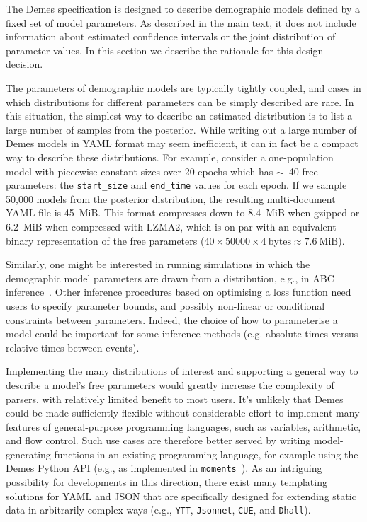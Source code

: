 \documentclass[11pt]{article}
\newcommand{\moments}[0]{\texttt{moments}}
\newcommand{\ggcomment}[1]{{\textcolor{yellow!60!red}{GG: #1}}}
\begin{document}
The Demes specification is designed to describe demographic
models defined by a fixed set of model parameters.
As described in the main text, it does not include
information about estimated confidence intervals or the joint distribution
of parameter values. In this section we describe the rationale
for this design decision.

The parameters of
demographic models are typically tightly coupled, and cases in which
distributions for different parameters can be simply described are rare.
In this situation, the simplest way to describe an estimated
distribution is to list a large number of samples from
the posterior. While writing out a large number of Demes models in
YAML format may seem inefficient, it can in fact be a compact
way to describe these distributions.
For example, consider a one-population model with piecewise-constant sizes over
20 epochs which has $\sim$~40 free parameters: the \texttt{start\_size} and
\texttt{end\_time} values for each epoch. If we sample 50,000 models
from the posterior distribution, the resulting multi-document YAML file is
45~MiB.
This format compresses down to 8.4~MiB when gzipped or 6.2~MiB
when compressed with LZMA2, which is on par with an equivalent binary
representation of the free parameters
($40\times50000\times4~\text{bytes} \approx 7.6~\text{MiB}$).

Similarly, one might be interested in running simulations in which
the demographic model parameters are drawn from a distribution, e.g.,
in ABC inference~\citep{beaumont2002approximate}.
Other inference procedures based on optimising a loss function
\citep{gutenkunst2009inferring,kamm2017efficient,jouganous2017inferring,ragsdale2019models,excoffier2021fastsimcoal2}
need users to specify parameter bounds,
and possibly non-linear or conditional constraints between parameters.
Indeed, the choice of how to parameterise a model could be important for
some inference methods (e.g. absolute times versus relative times between events).

Implementing the many distributions of interest and supporting a general
way to describe a model's free parameters would greatly increase the
complexity of parsers, with relatively limited benefit to most users.
It's unlikely that Demes could be made sufficiently
flexible without considerable effort to implement many features of
general-purpose programming languages, such as variables, arithmetic,
and flow control.
Such use cases are therefore better served by writing model-generating
functions in an existing programming language, for example
using the Demes Python API (e.g., as implemented in \moments\
\citep{jouganous2017inferring,ragsdale2019models}).
As an intriguing possibility for developments in this direction,
there exist many templating solutions for YAML and JSON that are
specifically designed for extending static data in arbitrarily complex ways
(e.g., \texttt{YTT}, \texttt{Jsonnet}, \texttt{CUE}, and \texttt{Dhall}).
\end{document}
